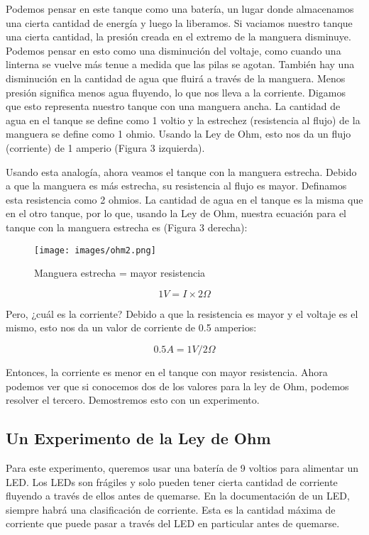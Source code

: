 \documentclass[output=paper, 
colorlinks,
citecolor=brown,
newtxmath
]{langscibook}
\begin{document}
Podemos pensar en este tanque como una batería, un lugar donde almacenamos una cierta cantidad de energía y luego la liberamos. Si vaciamos nuestro tanque una cierta cantidad, la presión creada en el extremo de la manguera disminuye. Podemos pensar en esto como una disminución del voltaje, como cuando una linterna se vuelve más tenue a medida que las pilas se agotan. También hay una disminución en la cantidad de agua que fluirá a través de la manguera. Menos presión significa menos agua fluyendo, lo que nos lleva a la corriente.
Digamos que esto representa nuestro tanque con una manguera ancha. La cantidad de agua en el tanque se define como 1 voltio y la estrechez (resistencia al flujo) de la manguera se define como 1 ohmio. Usando la Ley de Ohm, esto nos da un flujo (corriente) de 1 amperio (Figura 3 izquierda).

Usando esta analogía, ahora veamos el tanque con la manguera estrecha. Debido a que la manguera es más estrecha, su resistencia al flujo es mayor. Definamos esta resistencia como 2 ohmios. La cantidad de agua en el tanque es la misma que en el otro tanque, por lo que, usando la Ley de Ohm, nuestra ecuación para el tanque con la manguera estrecha es (Figura 3 derecha):

\begin{figure}[H]
\texttt{[image: images/ohm2.png]}
\caption{Manguera estrecha = mayor resistencia}
\label{fig:unidades}
\end{figure}

\[1V = I \times 2Ω\]


Pero, ¿cuál es la corriente? Debido a que la resistencia es mayor y el voltaje es el mismo, esto nos da un valor de corriente de 0.5 amperios:

\[0.5A = 1V / 2Ω\]

Entonces, la corriente es menor en el tanque con mayor resistencia. Ahora podemos ver que si conocemos dos de los valores para la ley de Ohm, podemos resolver el tercero. Demostremos esto con un experimento.

\subsection{Un Experimento de la Ley de Ohm}

Para este experimento, queremos usar una batería de 9 voltios para alimentar un LED. Los LEDs son frágiles y solo pueden tener cierta cantidad de corriente fluyendo a través de ellos antes de quemarse. En la documentación de un LED, siempre habrá una clasificación de corriente. Esta es la cantidad máxima de corriente que puede pasar a través del LED en particular antes de quemarse.
\end{document}

